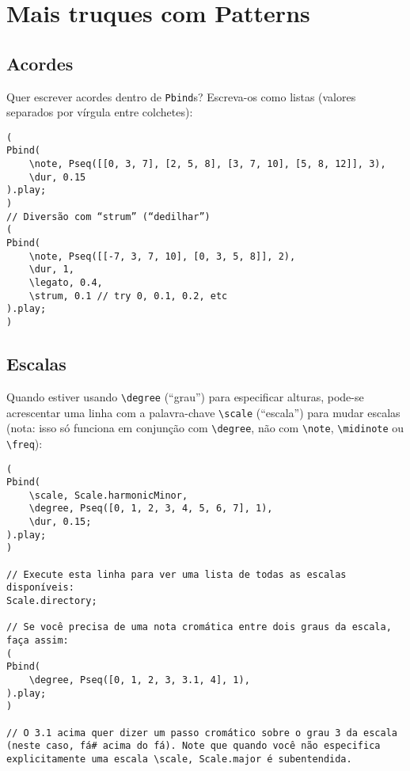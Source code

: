 \section{Mais truques com Patterns}

\subsection{Acordes}

Quer escrever acordes dentro de \texttt{Pbind}s? Escreva-os como listas (valores separados por vírgula entre colchetes):
 
\begin{lstlisting}[style=SuperCollider-IDE, basicstyle=\scttfamily\footnotesize]
(
Pbind(
	\note, Pseq([[0, 3, 7], [2, 5, 8], [3, 7, 10], [5, 8, 12]], 3),
	\dur, 0.15
).play;
)
// Diversão com “strum” (“dedilhar”)
(
Pbind(
	\note, Pseq([[-7, 3, 7, 10], [0, 3, 5, 8]], 2),
	\dur, 1,
	\legato, 0.4,
	\strum, 0.1 // try 0, 0.1, 0.2, etc
).play;
)
\end{lstlisting}
 

\subsection{Escalas}

Quando estiver usando \texttt{\textbackslash degree} (“grau”) para especificar alturas, pode-se acrescentar uma linha com a palavra-chave \texttt{\textbackslash scale} (“escala”) para mudar escalas (nota: isso só funciona em conjunção com \texttt{\textbackslash degree}, não com \texttt{\textbackslash note}, \texttt{\textbackslash midinote} ou \texttt{\textbackslash freq}):

 
\begin{lstlisting}[style=SuperCollider-IDE, basicstyle=\scttfamily\footnotesize]
(
Pbind(
	\scale, Scale.harmonicMinor,
	\degree, Pseq([0, 1, 2, 3, 4, 5, 6, 7], 1),
	\dur, 0.15;
).play;
)

// Execute esta linha para ver uma lista de todas as escalas disponíveis:
Scale.directory;

// Se você precisa de uma nota cromática entre dois graus da escala, faça assim:
(
Pbind(
	\degree, Pseq([0, 1, 2, 3, 3.1, 4], 1),
).play;
)

// O 3.1 acima quer dizer um passo cromático sobre o grau 3 da escala (neste caso, fá# acima do fá). Note que quando você não especifica explicitamente uma escala \scale, Scale.major é subentendida.
\end{lstlisting}

